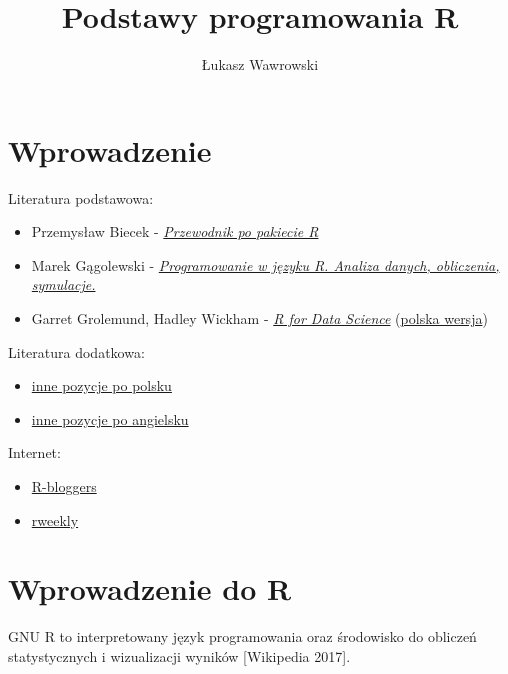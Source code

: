 \documentclass[]{book}
\title{Podstawy programowania R}
\author{Łukasz Wawrowski}
\date{}
\providecommand{\tightlist}{%
  \setlength{\itemsep}{0pt}\setlength{\parskip}{0pt}}
\begin{document}
\maketitle

{
\setcounter{tocdepth}{1}
\tableofcontents
}
\chapter*{Wprowadzenie}\label{wprowadzenie}

Literatura podstawowa:

\begin{itemize}
\tightlist
\item
  Przemysław Biecek -
  \href{http://pbiecek.github.io/Przewodnik/}{\emph{Przewodnik po
  pakiecie R}}
\item
  Marek Gągolewski -
  \href{http://www.gagolewski.com/publications/programowanier/}{\emph{Programowanie
  w języku R. Analiza danych, obliczenia, symulacje.}}
\item
  Garret Grolemund, Hadley Wickham -
  \href{http://r4ds.had.co.nz/}{\emph{R for Data Science}}
  (\href{https://helion.pl/ksiazki/jezyk-r-kompletny-zestaw-narzedzi-dla-analitykow-danych-hadley-wickham-garrett-grolemund,jezrko.htm}{polska
  wersja})
\end{itemize}

Literatura dodatkowa:

\begin{itemize}
\tightlist
\item
  \href{https://github.com/mi2-warsaw/SER/blob/master/histoRia/README.md}{inne
  pozycje po polsku}
\item
  \href{https://bookdown.org/}{inne pozycje po angielsku}
\end{itemize}

Internet:

\begin{itemize}
\tightlist
\item
  \href{https://www.r-bloggers.com/}{R-bloggers}
\item
  \href{https://rweekly.org/}{rweekly}
\end{itemize}

\chapter{Wprowadzenie do R}\label{wprowadzenie-do-r}

GNU R to interpretowany język programowania oraz środowisko do obliczeń
statystycznych i wizualizacji wyników {[}Wikipedia 2017{]}.
\end{document}
